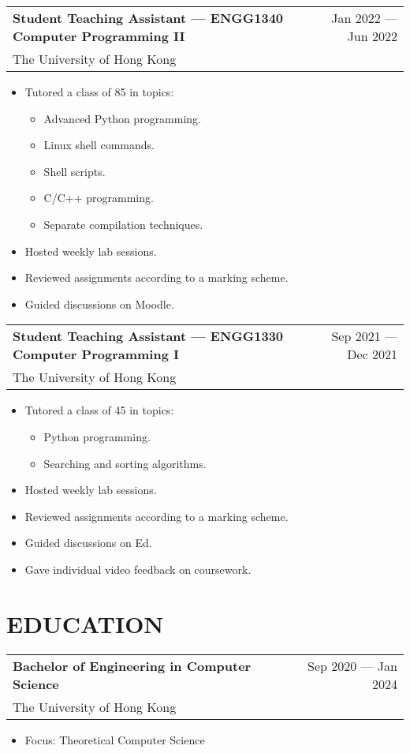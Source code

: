 \documentclass{article}
\makeatletter
\newcommand{\jobTitle}[3]{
    \vspace{0.3cm}
    \begin{tabular*}{1\textwidth}{||l@{\extracolsep{\fill}}r}
        \textbf{#1} & #2\\
        #3 &
    \end{tabular*}
}
\makeatother
\begin{document}
\jobTitle
{Student Teaching Assistant --- ENGG1340 Computer Programming II}
{Jan 2022 --- Jun 2022}
{The University of Hong Kong}
\begin{itemize}[leftmargin=1.2cm]
    \item Tutored a class of 85 in topics:
    \begin{itemize}
        \item Advanced Python programming.
        \item Linux shell commands.
        \item Shell scripts.
        \item C/C++ programming.
        \item Separate compilation techniques.
    \end{itemize}
    \item Hosted weekly lab sessions.
    \item Reviewed assignments according to a marking scheme.
    \item Guided discussions on Moodle.
\end{itemize}

\jobTitle
{Student Teaching Assistant --- ENGG1330 Computer Programming I}
{Sep 2021 --- Dec 2021}
{The University of Hong Kong}
\begin{itemize}[leftmargin=1.2cm]
    \item Tutored a class of 45 in topics:
    \begin{itemize}
        \item Python programming.
        \item Searching and sorting algorithms.
    \end{itemize}
    \item Hosted weekly lab sessions.
    \item Reviewed assignments according to a marking scheme.
    \item Guided discussions on Ed.
    \item Gave individual video feedback on coursework.
\end{itemize}

\section{EDUCATION}

\jobTitle
{Bachelor of Engineering in Computer Science}
{Sep 2020 --- Jan 2024}
{The University of Hong Kong}
\begin{itemize}[leftmargin=1.2cm]
    \item Focus: Theoretical Computer Science
\end{itemize}
\end{document}
